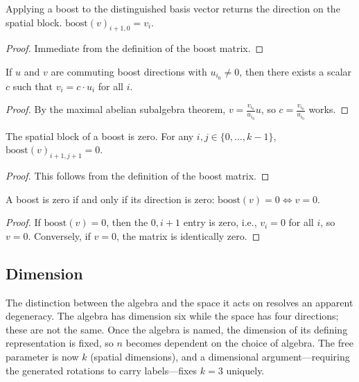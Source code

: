\begin{theorem}
Applying a boost to the distinguished basis vector returns the direction on the spatial block.
$\text{boost}(v)_{i+1, 0} = v_i$.
\end{theorem}
\begin{proof}
Immediate from the definition of the boost matrix.
\end{proof}

\begin{theorem}
If $u$ and $v$ are commuting boost directions with $u_{i_0} \neq 0$, then there exists
a scalar $c$ such that $v_i = c \cdot u_i$ for all $i$.
\end{theorem}
\begin{proof}
By the maximal abelian subalgebra theorem, $v = \frac{v_{i_0}}{u_{i_0}} u$, so $c = \frac{v_{i_0}}{u_{i_0}}$ works.
\end{proof}

\begin{theorem}
The spatial block of a boost is zero. For any $i, j \in \{0, \ldots, k-1\}$,
$\text{boost}(v)_{i+1, j+1} = 0$.
\end{theorem}
\begin{proof}
This follows from the definition of the boost matrix.
\end{proof}

\begin{theorem}
A boost is zero if and only if its direction is zero: $\text{boost}(v) = 0 \iff v = 0$.
\end{theorem}
\begin{proof}
If $\text{boost}(v) = 0$, then the $0, i+1$ entry is zero, i.e., $v_i = 0$ for all $i$, so $v = 0$.
Conversely, if $v = 0$, the matrix is identically zero.
\end{proof}

\subsection{Dimension}

The distinction between the algebra and the space it acts on resolves an apparent degeneracy.
The algebra has dimension six while the space has four directions; these are not the same.
Once the algebra is named, the dimension of its defining representation is fixed, so $n$ becomes
dependent on the choice of algebra. The free parameter is now $k$ (spatial dimensions),
and a dimensional argument—requiring the generated rotations to carry labels—fixes $k = 3$ uniquely.

